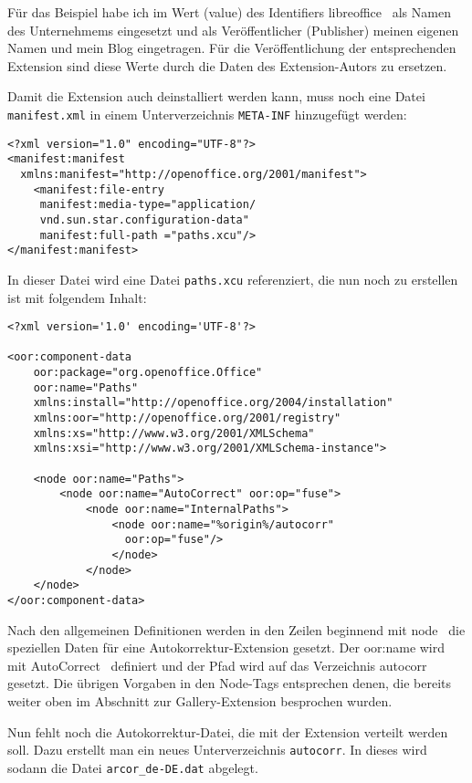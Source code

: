 \documentclass[a4paper,10pt,pagesize,titlepage]{scrbook}
\begin{document}
Für das Beispiel habe ich im Wert (value) des Identifiers \glqq libreoffice\grqq~ als Namen des Unternehmems eingesetzt und als Veröffentlicher (Publisher) meinen eigenen Namen und mein Blog eingetragen. Für die Veröffentlichung der entsprechenden Extension sind diese Werte durch die Daten des Extension-Autors zu ersetzen.

Damit die Extension auch deinstalliert werden kann, muss noch eine Datei \verb|manifest.xml| in einem Unterverzeichnis \verb|META-INF| hinzugefügt werden:
\begin{lstlisting}
<?xml version="1.0" encoding="UTF-8"?>
<manifest:manifest 
  xmlns:manifest="http://openoffice.org/2001/manifest">
    <manifest:file-entry
     manifest:media-type="application/
     vnd.sun.star.configuration-data" 
     manifest:full-path ="paths.xcu"/>
</manifest:manifest>
\end{lstlisting}

In dieser Datei wird eine Datei \verb|paths.xcu| referenziert, die nun noch zu erstellen ist mit folgendem Inhalt:

\begin{lstlisting}
<?xml version='1.0' encoding='UTF-8'?>

<oor:component-data 
    oor:package="org.openoffice.Office" 
    oor:name="Paths" 
    xmlns:install="http://openoffice.org/2004/installation" 
    xmlns:oor="http://openoffice.org/2001/registry" 
    xmlns:xs="http://www.w3.org/2001/XMLSchema" 
    xmlns:xsi="http://www.w3.org/2001/XMLSchema-instance">

    <node oor:name="Paths">
        <node oor:name="AutoCorrect" oor:op="fuse">
            <node oor:name="InternalPaths">
                <node oor:name="%origin%/autocorr" 
                  oor:op="fuse"/>
                </node>
            </node>
    </node>
</oor:component-data>
\end{lstlisting}

Nach den allgemeinen Definitionen werden in den Zeilen beginnend mit \glqq node\grqq~ die speziellen Daten für eine Autokorrektur-Extension gesetzt. Der oor:name wird mit \glqq AutoCorrect\grqq~ definiert und der Pfad wird auf das Verzeichnis \glqq autocorr\grqq~ gesetzt. Die übrigen Vorgaben in den Node-Tags entsprechen denen, die bereits weiter oben im Abschnitt zur Gallery-Extension besprochen wurden.

Nun fehlt noch die Autokorrektur-Datei, die mit der Extension verteilt werden soll. Dazu erstellt man ein neues Unterverzeichnis \verb|autocorr|. In dieses wird sodann die Datei \verb|arcor_de-DE.dat| abgelegt.
\end{document}
